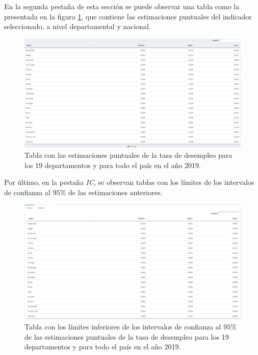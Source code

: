 \documentclass[12pt,twoside,spanish,a4paper]{book}\usepackage[]{graphicx}\usepackage[]{color}
\begin{document}
En la segunda pestaña de esta sección se puede observar una tabla como la presentada en la figura \ref{tabl}, que contiene las estimaciones puntuales del indicador seleccionado, a nivel departamental y nacional.

\begin{figure}[htb]
\begin{center}
\includegraphics[width=1.2\textwidth]{img/tabla.PNG}
\caption{Tabla con las estimaciones puntuales de la tasa de desempleo para los 19 departamentos y para todo el país en el año 2019. \label{tabl}}
\end{center}
\end{figure}

Por último, en la pestaña \textit{IC}, se observan tablas con los límites de los intervalos de confianza al $95\%$ de las estimaciones anteriores.

\begin{figure}[htb]
\includegraphics[width=1.2\textwidth]{img/inf.PNG}
\caption{Tabla con los límites inferiores de los intervalos de confianza al $95\%$ de las estimaciones puntuales de la tasa de desempleo para los 19 departamentos y para todo el país en el año 2019. \label{tablinf}}
\end{figure}
\end{document}
